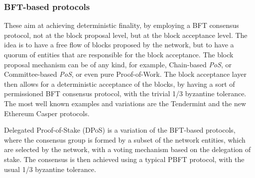 \documentclass[journal]{IEEEtran}
\begin{document}
\subsubsection{BFT-based protocols}

These aim at achieving deterministic finality, by employing a BFT
consensus protocol, not at the block proposal level, but at the
block acceptance level. The idea is to have a free flow of blocks
proposed by the network, but to have a quorum of entities that
are responsible for the block acceptance. The block proposal mechanism
can be of any kind, for example, Chain-based \emph{PoS}, or Committee-based \emph{PoS},
or even pure Proof-of-Work. The block acceptance layer then allows
for a deterministic acceptance of the blocks, by having a sort of permissioned
BFT consensus protocol, with the trivial 1/3 byzantine tolerance. The most well known examples
and variations are the Tendermint \cite{buchman2016tendermint} and the new Ethereum Casper 
\cite{buterin2017casper} protocols.

Delegated Proof-of-Stake (DPoS) is a variation of the BFT-based protocols,
where the consensus group is formed by a subset of the network entities,
which are selected by the network, with a voting mechanism based on the
delegation of stake. The consensus is then achieved using a typical 
PBFT protocol, with the usual 1/3 byzantine tolerance.

\subsection{}



%
%
\end{document}
